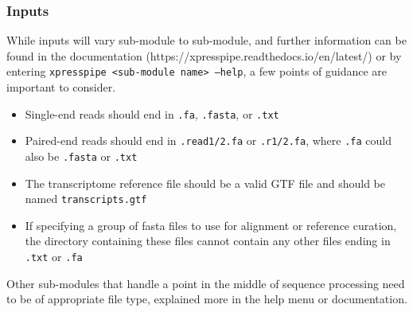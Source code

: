 \documentclass[11pt, a4paper, oneside]{article}
\begin{document}
\subsubsection{Inputs}
While inputs will vary sub-module to sub-module, and further information can be found in the documentation (https://xpresspipe.readthedocs.io/en/latest/) or by entering \texttt{xpresspipe \textless sub-module name\textgreater \ --help}, a few points of guidance are important to consider.

\begin{itemize}
\item Single-end reads should end in \texttt{.fa}, \texttt{.fasta}, or \texttt{.txt}
\item Paired-end reads should end in \texttt{.read1/2.fa} or \texttt{.r1/2.fa}, where \texttt{.fa} could also be \texttt{.fasta} or \texttt{.txt}
\item The transcriptome reference file should be a valid GTF file and should be named \texttt{transcripts.gtf}
\item If specifying a group of fasta files to use for alignment or reference curation, the directory containing these files cannot contain any other files ending in \texttt{.txt} or \texttt{.fa}
\end{itemize}

Other sub-modules that handle a point in the middle of sequence processing need to be of appropriate file type, explained more in the help menu or documentation.
\end{document}
